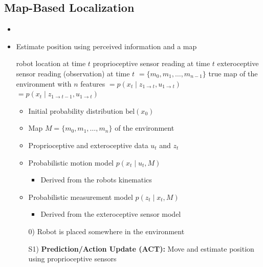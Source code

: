 \subsection{Map-Based Localization}
\begin{itemize}
    \item {}
    \item Estimate position using perceived information and a map
        \begin{itemize*}
             robot location at time $t$
             proprioceptive sensor reading at time $t$
             exteroceptive sensor reading (observation) at time $t$
            $= \{m_0, m_1, \dots, m_{n-1}\}$ true map of the environment with $n$ features
            $= p(x_t \mid z_{1 \to t}, u_{1 \to t})$
            $= p(x_t \mid z_{1 \to t - 1}, u_{1 \to t})$
        \end{itemize*}
        \begin{itemize}
            \item Initial probability distribution $\text{bel}(x_0)$
            \item Map $M = \{m_0, m_1, \dots, m_n\}$ of the environment
            \item Proprioceptive and exteroceptive data $u_t$ and $z_t$
            \item Probabilistic motion model $p(x_t \mid u_t, M)$
                \begin{itemize}
                    \item Derived from the robots kinematics
                \end{itemize}
            \item Probabilistic measurement model $p(z_t \mid x_t, M)$
                \begin{itemize}
                    \item Derived from the exteroceptive sensor model
                \end{itemize}
        \end{itemize}
        \begin{itemize}
            \item[0)] Robot is placed somewhere in the environment
            \item[S1)] \textbf{Prediction/Action Update (ACT):} Move and estimate position using proprioceptive sensors

\end{itemize}
\end{itemize}
